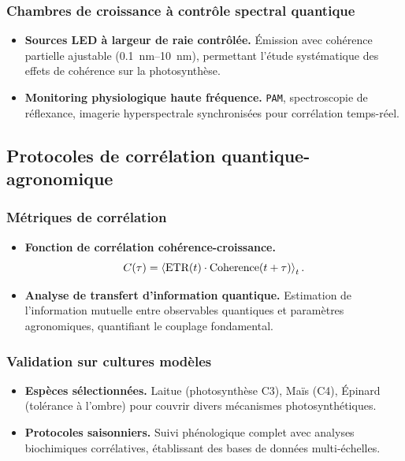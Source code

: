 \documentclass[12pt, a4paper]{article}
\begin{document}
\subsubsection{Chambres de croissance à contrôle spectral quantique}

\begin{itemize}
    \item \textbf{Sources LED à largeur de raie contrôlée.} Émission avec cohérence partielle ajustable (\SIrange{0.1}{10}{\nano\meter}), permettant l'étude systématique des effets de cohérence sur la photosynthèse.
    
    \item \textbf{Monitoring physiologique haute fréquence.} \texttt{PAM}, spectroscopie de réflexance, imagerie hyperspectrale synchronisées pour corrélation temps-réel.
\end{itemize}

\subsection{Protocoles de corrélation quantique-agronomique}

\subsubsection{Métriques de corrélation}

\begin{itemize}
    \item \textbf{Fonction de corrélation cohérence-croissance.}
        \begin{equation}
            C(\tau) = \ev {\text{ETR}(t) \cdot \text{Coherence}(t+\tau)}_t .
        \end{equation}
    
    \item \textbf{Analyse de transfert d'information quantique.} Estimation de l'information mutuelle entre observables quantiques et paramètres agronomiques, quantifiant le couplage fondamental.
\end{itemize}

\subsubsection{Validation sur cultures modèles}

\begin{itemize}
    \item \textbf{Espèces sélectionnées.} Laitue (photosynthèse C3), Maïs (C4), Épinard (tolérance à l'ombre) pour couvrir divers mécanismes photosynthétiques.
    
    \item \textbf{Protocoles saisonniers.} Suivi phénologique complet avec analyses biochimiques corrélatives, établissant des bases de données multi-échelles.
\end{itemize}
\end{document}
